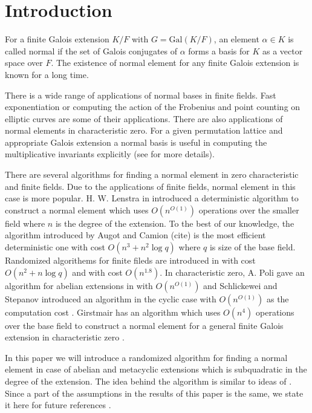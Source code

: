 \documentclass[sigconf]{acmart}
\theoremstyle{acmplain}
\begin{document}
\maketitle

\section{Introduction}

For a finite Galois extension $K/F$ with $G = \mathrm{Gal}(K/F)$, an element $\alpha \in K$
is called normal if the set of Galois conjugates of $\alpha$ forms a basis for $K$ as a
 vector space over $F$. The existence of normal element for any finite Galois extension is 
 known for a long time.
 
There is a wide range of applications of normal bases in finite fields. Fast exponentiation 
or computing the action of the Frobenius and point counting on elliptic curves are some of their applications. There are also 
applications of normal elements in characteristic zero. For a given permutation lattice and appropriate Galois extension
a normal basis is useful in computing the multiplicative invariants explicitly (see \cite{Armin} for more details).   

There are several algorithms for finding a normal element in zero characteristic and finite fields. Due to the applications of
finite fields, normal element in this case is more popular. H. W. Lenstra in \cite{LenstraNormal} introduced a deterministic 
algorithm to construct a normal element which uses $O(n^{O(1)})$ operations over the smaller field where $n$ is the degree of the
 extension. To the best of
our knowledge, the algorithm introduced by Augot and Camion (cite) is the most efficient deterministic one with cost 
$O(n^3+n^2\log q)$
where $q$ is size of the base field. Randomized algorithems for finite fileds are introduced in \cite{Giesbrecht} with cost
$O(n^2+n\log q)$ and \cite{Kaltoefen} with cost $O(n^{1.8})$. In characteristic zero, A. Poli gave an algorithm for abelian extensions in \cite{Poli} with $O(n^{O(1)})$ and Schlickewei and Stepanov introduced an algorithm in the cyclic case with
$O(n^{O(1)})$ as the computation cost \cite{Stepanov}. Girstmair has an algorithm which uses $O(n^4)$ operations over the base field to construct a normal element for a general finite Galois extension in characteristic zero \cite{Girstmair}. 

In this paper we will introduce a randomized algorithm for finding a normal element in case of abelian and metacyclic extensions
 which is subquadratic in the degree of the extension. The idea behind the algorithm is similar to ideas of 
\cite{Giesbrecht,Kaltofen}. Since a part of the assumptions in the results of this paper is the same, we state it here 
for future references .
\end{document}
